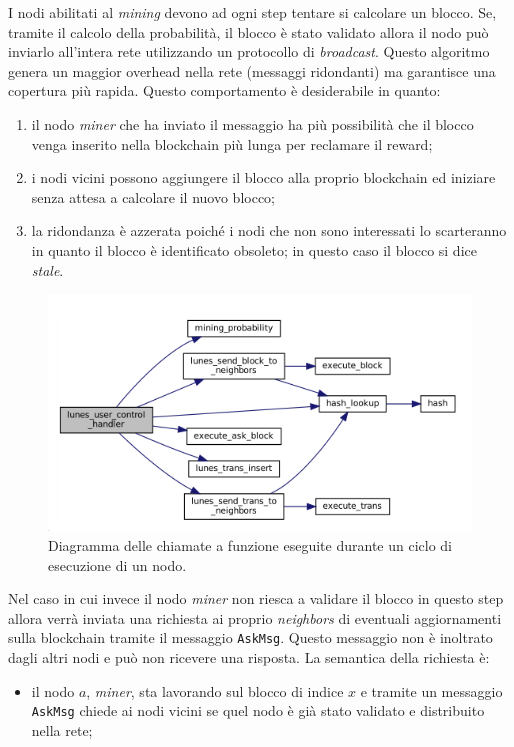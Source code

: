 \begin{code}
I nodi abilitati al \textit{mining} devono ad ogni step tentare si calcolare un blocco. Se, tramite il calcolo della probabilità, il blocco è stato validato allora il nodo può inviarlo all'intera rete utilizzando un protocollo di \textit{broadcast}. Questo algoritmo genera un maggior overhead nella rete (messaggi ridondanti) ma garantisce una copertura più rapida. Questo comportamento è desiderabile in quanto:
\begin{enumerate}
    \item il nodo \textit{miner} che ha inviato il messaggio ha più possibilità che il blocco venga inserito nella blockchain più lunga per reclamare il reward;
    \item i nodi vicini possono aggiungere il blocco alla proprio blockchain ed iniziare senza attesa a calcolare il nuovo blocco;
    \item la ridondanza è azzerata poiché i nodi che non sono interessati lo scarteranno in quanto il blocco è identificato obsoleto; in questo caso il blocco si dice \textit{stale}.
\end{enumerate}
\begin{figure}[H]
    \centering
    \includegraphics[width=\textwidth]{./images/graphcall_node_routine.png}
    \caption{Diagramma delle chiamate a funzione eseguite durante un ciclo di esecuzione di un nodo.}
\end{figure}
Nel caso in cui invece il nodo \textit{miner} non riesca a validare il blocco in questo step allora verrà inviata una richiesta ai proprio \textit{neighbors} di eventuali aggiornamenti sulla blockchain tramite il messaggio \texttt{AskMsg}. Questo messaggio non è inoltrato dagli altri nodi e può non ricevere una risposta. La semantica della richiesta è: 
\begin{itemize}
    \item il nodo $a$, \textit{miner}, sta lavorando sul blocco di indice $x$ e tramite un messaggio \texttt{AskMsg} chiede ai nodi vicini se quel nodo è già stato validato e distribuito nella rete;

\end{itemize}
\end{code}
